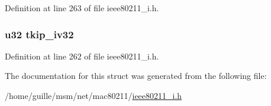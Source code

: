 Definition at line 263 of file ieee80211\-\_\-i.\-h.

\hypertarget{structieee80211__rx__data_a0f259da682b3ab5890f6e19716221029}{
\subsubsection[{tkip\-\_\-iv32}]{\setlength{\rightskip}{0pt plus 5cm}u32 tkip\-\_\-iv32}}\label{structieee80211__rx__data_a0f259da682b3ab5890f6e19716221029}


Definition at line 262 of file ieee80211\-\_\-i.\-h.



The documentation for this struct was generated from the following file\-:\begin{DoxyCompactItemize}
\item 
/home/guille/msm/net/mac80211/\hyperlink{ieee80211__i_8h}{ieee80211\-\_\-i.\-h}\end{DoxyCompactItemize}
